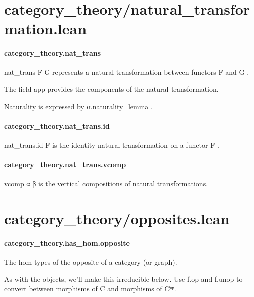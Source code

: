 \documentclass{article}
\begin{document}
\section{category\_theory/natural\_transformation.lean}\paragraph{category\_theory.nat\_trans}
\par
\colorbox[RGB]{253,246,227}{{{{\color[RGB]{101, 123, 131} nat\_trans F G }}}} represents a natural transformation between functors 
\colorbox[RGB]{253,246,227}{{{{\color[RGB]{101, 123, 131} F }}}} and 
\colorbox[RGB]{253,246,227}{{{{\color[RGB]{101, 123, 131} G }}}}.
\par
The field 
\colorbox[RGB]{253,246,227}{{{{\color[RGB]{101, 123, 131} app }}}} provides the components of the natural transformation.
\par
Naturality is expressed by 
\colorbox[RGB]{253,246,227}{{{{\color[RGB]{101, 123, 131} α.naturality\_lemma }}}}.
\paragraph{category\_theory.nat\_trans.id}
\par
\colorbox[RGB]{253,246,227}{{{{\color[RGB]{101, 123, 131} nat\_trans.id F }}}} is the identity natural transformation on a functor 
\colorbox[RGB]{253,246,227}{{{{\color[RGB]{101, 123, 131} F }}}}.
\paragraph{category\_theory.nat\_trans.vcomp}
\par
\colorbox[RGB]{253,246,227}{{{{\color[RGB]{101, 123, 131} vcomp α β }}}} is the vertical compositions of natural transformations.
\section{category\_theory/opposites.lean}\paragraph{category\_theory.has\_hom.opposite}
\par
The hom types of the opposite of a category (or graph).
\par
As with the objects, we'll make this irreducible below.
Use 
\colorbox[RGB]{253,246,227}{{{{\color[RGB]{101, 123, 131} f.op }}}} and 
\colorbox[RGB]{253,246,227}{{{{\color[RGB]{101, 123, 131} f.unop }}}} to convert between morphisms of C
and morphisms of Cᵒᵖ.
\end{document}
